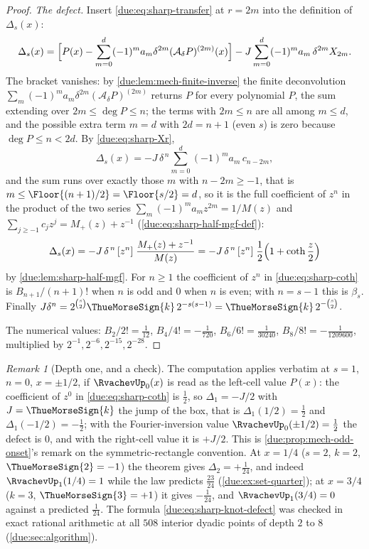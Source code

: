 \documentclass[11pt,oneside]{article}
\theoremstyle{plain}
\theoremstyle{definition}
\theoremstyle{remark}
\newtheorem{remark}[theorem]{Remark}
\newcommand{\upn}[1]{\RvachevUp_{#1}}
\newcommand{\am}[1]{a_{#1}}                                 %
\begin{document}
\begin{proof}
\emph{The defect.}
Insert \cref{due:eq:sharp-transfer} at $r=2m$ into the definition of
$\Delta_{s}(x)$:
\[
 \Delta_{s}(x)=\Bigl[P(x)-\sum_{m=0}^{d}(-1)^{m}\am{m}\delta^{2m}
 (\mathcal A_{\delta}P)^{(2m)}(x)\Bigr]
 -J\sum_{m=0}^{d}(-1)^{m}\am{m}\,\delta^{2m}X_{2m}.
\]
The bracket vanishes: by \cref{due:lem:mech-finite-inverse} the finite
deconvolution $\sum_{m}(-1)^{m}\am{m}\delta^{2m}(\mathcal A_{\delta}P)^{(2m)}$
returns $P$ for every polynomial $P$, the sum extending over
$2m\le\deg P\le n$; the terms with $2m\le n$ are all among $m\le d$, and
the possible extra term $m=d$ with $2d=n+1$ (even $s$) is zero because
$\deg P\le n<2d$.  By \cref{due:eq:sharp-Xr},
\[
 \Delta_{s}(x)=-J\,\delta^{\,n}\sum_{m=0}^{d}(-1)^{m}\am{m}\,c_{n-2m},
\]
and the sum runs over exactly those $m$ with $n-2m\ge-1$, that is
$m\le\Floor{(n+1)/2}=\Floor{s/2}=d$, so it is the full coefficient of
$z^{n}$ in the product of the two series $\sum_{m}(-1)^{m}\am{m}z^{2m}=1/M(z)$
and $\sum_{j\ge-1}c_{j}z^{j}=M_{+}(z)+z^{-1}$
(\cref{due:eq:sharp-half-mgf-def}):
\[
 \Delta_{s}(x)=-J\,\delta^{\,n}\,[z^{n}]\;\frac{M_{+}(z)+z^{-1}}{M(z)}
 =-J\,\delta^{\,n}\,[z^{n}]\;\frac12\Bigl(1+\coth\frac z2\Bigr)
\]
by \cref{due:lem:sharp-half-mgf}.  For $n\ge1$ the coefficient of $z^{n}$
in \cref{due:eq:sharp-coth} is $B_{n+1}/(n+1)!$ when $n$ is odd and $0$ when
$n$ is even; with $n=s-1$ this is $\beta_{s}$.  Finally
$J\delta^{n}=2^{\binom s2}\ThueMorseSign{k}\,2^{-s(s-1)}
=\ThueMorseSign{k}\,2^{-\binom s2}$.

The numerical values: $B_{2}/2!=\tfrac1{12}$, $B_{4}/4!=-\tfrac1{720}$,
$B_{6}/6!=\tfrac1{30240}$, $B_{8}/8!=-\tfrac1{1209600}$, multiplied by
$2^{-1},2^{-6},2^{-15},2^{-28}$.
\end{proof}

\begin{remark}[Depth one, and a check]
\label{due:rmk:sharp-depth-one}
The computation applies verbatim at $s=1$, $n=0$, $x=\pm1/2$, if
$\upn{0}(x)$ is read as the left-cell value $P(x)$: the coefficient of $z^{0}$
in \cref{due:eq:sharp-coth} is $\tfrac12$, so $\Delta_{1}=-J/2$ with
$J=\ThueMorseSign{k}$ the jump of the box, that is $\Delta_{1}(1/2)=\tfrac12$
and $\Delta_{1}(-1/2)=-\tfrac12$; with the Fourier-inversion value
$\upn{0}(\pm1/2)=\tfrac12$ the defect is $0$, and with the right-cell value it
is $+J/2$.  This is \cref{due:prop:mech-odd-onset}'s remark on the
symmetric-rectangle convention.  At $x=1/4$ ($s=2$, $k=2$,
$\ThueMorseSign{2}=-1$) the theorem gives $\Delta_{2}=+\tfrac1{24}$, and indeed
$\upn{1}(1/4)=1$ while the law predicts $\tfrac{23}{24}$
(\cref{due:ex:set-quarter}); at $x=3/4$ ($k=3$, $\ThueMorseSign{3}=+1$) it
gives $-\tfrac1{24}$, and $\upn{1}(3/4)=0$ against a predicted
$\tfrac1{24}$.  The formula \cref{due:eq:sharp-knot-defect} was checked in
exact rational arithmetic at all $508$ interior dyadic points of depth $2$
to $8$ (\cref{due:sec:algorithm}).
\end{remark}
\end{document}
